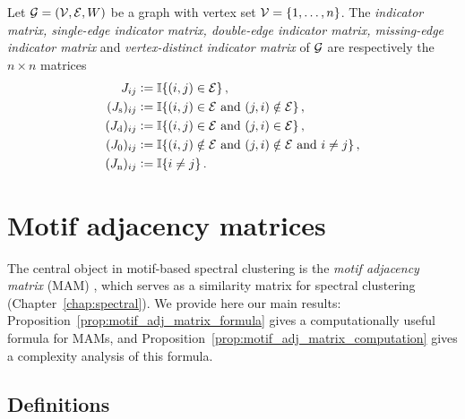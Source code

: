 \begin{definition}
Let $\mathcal{G} = (\mathcal{V,E},W)$ be a graph with vertex set $\mathcal{V} = \{1, \ldots, n \}$. The \emph{indicator matrix, single-edge indicator matrix, double-edge indicator matrix, missing-edge indicator matrix} and \emph{vertex-distinct indicator matrix} of $\mathcal{G}$ are respectively the $n \times n$ matrices
\begin{align*}
	J_{ij} &\vcentcolon= \mathbb{I} \{ (i,j) \in \mathcal{E} \}\,, \\
	(J_\mathrm{s})_{ij} &\vcentcolon= \mathbb{I} \{ (i,j) \in \mathcal{E} \textrm{ and } (j,i) \notin \mathcal{E} \}\,, \\
	(J_\mathrm{d})_{ij} &\vcentcolon= \mathbb{I} \{ (i,j) \in \mathcal{E} \textrm{ and } (j,i) \in \mathcal{E} \}\,, \\
	(J_0)_{ij} &\vcentcolon= \mathbb{I} \{ (i,j) \notin \mathcal{E} \textrm{ and } (j,i) \notin \mathcal{E} \textrm{ and } i \neq j \}\,, \\
	(J_\mathrm{n})_{ij} &\vcentcolon= \mathbb{I} \{ i \neq j \}\,.
\end{align*}
\end{definition}











\section{Motif adjacency matrices} \label{sec:graphs_motif_adj_matrices}

The central object in motif-based spectral clustering is the \emph{motif adjacency matrix} (MAM) \cite{benson2016higher}, which serves as a similarity matrix for spectral clustering (Chapter~\ref{chap:spectral}).
We provide here our main results: Proposition~\ref{prop:motif_adj_matrix_formula} gives a computationally useful formula for MAMs, and Proposition~\ref{prop:motif_adj_matrix_computation} gives a complexity analysis of this formula.









\pagebreak

\subsection{Definitions}

